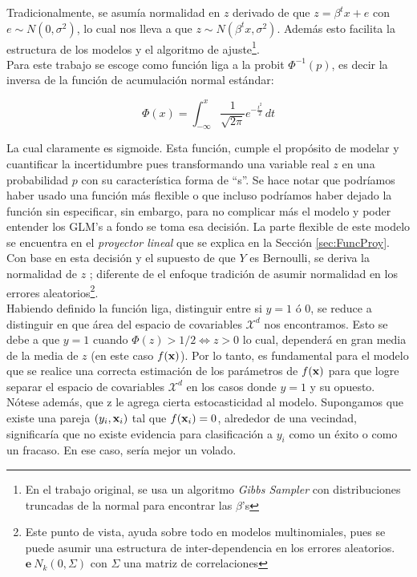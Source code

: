\documentclass[../Main/Main.tex]{subfiles}
\begin{document}
Tradicionalmente, se asumía normalidad en $z$ derivado de que $z = \beta^tx + e$ con $e \sim N(0,\sigma^2)$, lo cual nos lleva a que $z \sim N(\beta^tx,\sigma^2)$. Además esto facilita la estructura de los modelos y el algoritmo de ajuste\footnote{En el trabajo original, se usa un algoritmo \textit{Gibbs Sampler} con distribuciones truncadas de la normal para encontrar las $\beta$'s}.\\

Para este trabajo se escoge como función liga a la probit $\Phi^{-1}(p)$, es decir la inversa de la función de acumulación normal estándar:

$$\Phi(x) = \int_{-\infty}^x \dfrac{1}{\sqrt{2\pi}}e^{-\frac{t^2}{2}}\, dt$$

La cual claramente es sigmoide. Esta función, cumple el propósito de modelar y cuantificar la incertidumbre pues transformando una variable real $z$ en una probabilidad $p$ con su característica forma de ``s''. Se hace notar que podríamos haber usado una función más flexible o que incluso podríamos haber dejado la función sin especificar, sin embargo, para no complicar más el modelo y poder entender los GLM's a fondo se toma esa decisión. La parte flexible de este modelo se encuentra en el \textit{proyector lineal} que se explica en la Sección \ref{sec:FuncProy}. Con base en esta decisión y el supuesto de que $Y$ es Bernoulli, se deriva la normalidad de $z$ \autocite{albert1993bayesian}; diferente de el enfoque tradición de asumir normalidad en los errores aleatorios\footnote{Este punto de vista, ayuda sobre todo en modelos multinomiales, pues se puede asumir una estructura de inter-dependencia en los errores aleatorios. $\mathbf{e} ~ N_k(0, \Sigma)$ con $\Sigma$ una matriz de correlaciones}.\\

Habiendo definido la función liga, distinguir entre si $y = 1$ ó 0, se reduce a distinguir en que área del espacio de covariables $\mathcal{X}^d$ nos encontramos. Esto se debe a que $y = 1$ cuando $\Phi(z) > 1/2 \iff z>0$ lo cual, dependerá en gran media de la media de $z$ (en este caso $f(\mathbf{x})$). Por lo tanto, es fundamental para el modelo que se realice una correcta estimación de los parámetros de $f(\mathbf{x})$ para que logre separar el espacio de covariables $\mathcal{X}^d$ en los casos donde $y = 1$ y su opuesto. Nótese además, que z le agrega cierta estocasticidad al modelo. Supongamos que existe una pareja $(y_i,\mathbf{x}_i)$ tal que $f(\mathbf{x}_i) = 0$, alrededor de una vecindad, significaría que no existe evidencia para clasificación a $y_i$ como un éxito o como un fracaso. En ese caso, sería mejor un volado. \\ 
\end{document}
